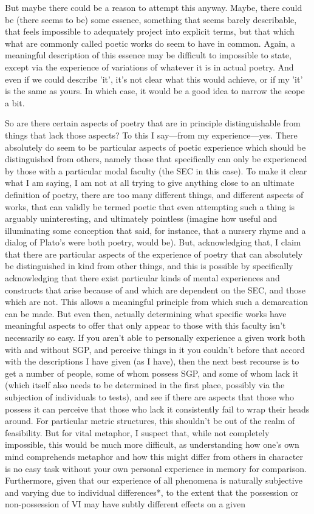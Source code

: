 \documentclass[]{article}
\begin{document}
But maybe there could be a reason to attempt this anyway. Maybe, there could be (there seems to be) some essence, something that seems barely describable, that feels impossible to adequately project into explicit terms, but that which what are commonly called poetic works do seem to have in common. Again, a meaningful description of this essence may be difficult to impossible to state, except via the experience of variations of whatever it is in actual poetry. And even if we could describe 'it', it's not clear what this would achieve, or if my 'it' is the same as yours. In which case, it would be a good idea to narrow the scope a bit.



So are there certain aspects of poetry that are in principle distinguishable from things that lack those aspects? To this I say—from my experience—yes. There absolutely do seem to be particular aspects of poetic experience which should be distinguished from others, namely those that specifically can only be experienced by those with a particular modal faculty (the SEC in this case). To make it clear what I am saying, I am not at all trying to give anything close to an ultimate definition of poetry, there are too many different things, and different aspects of works, that can validly be termed poetic that even attempting such a thing is arguably uninteresting, and ultimately pointless (imagine how useful and illuminating some conception that said, for instance, that a nursery rhyme and a dialog of Plato's were both poetry, would be). But, acknowledging that, I claim that there are particular aspects of the experience of poetry that can absolutely be distinguished in kind from other things, and this is possible by specifically acknowledging that there exist particular kinds of mental experiences and constructs that arise because of and which are dependent on the SEC, and those which are not. This allows a meaningful principle from which such a demarcation can be made. But even then, actually determining what specific works have meaningful aspects to offer that only appear to those with this faculty isn't necessarily so easy. If you aren't able to personally experience a given work both with and without SGP, and perceive things in it you couldn't before that accord with the descriptions I have given (as I have), then the next best recourse is to get a number of people, some of whom possess SGP, and some of whom lack it (which itself also needs to be determined in the first place, possibly via the subjection of individuals to tests), and see if there are aspects that those who possess it can perceive that those who lack it consistently fail to wrap their heads around. For particular metric structures, this shouldn't be out of the realm of feasibility. But for vital metaphor, I suspect that, while not completely impossible, this would be much more difficult, as understanding how one's own mind comprehends metaphor and how this might differ from others in character is no easy task without your own personal experience in memory for comparison. Furthermore, given that our experience of all phenomena is naturally subjective and varying due to individual differences*, to the extent that the possession or non-possession of VI may have subtly different effects on a given 
\end{document}
